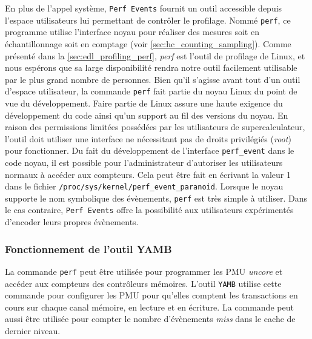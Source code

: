             En plus de l'appel système, \texttt{Perf Events} fournit un outil accessible depuis l'espace utilisateurs lui permettant de contrôler le profilage. Nommé \texttt{perf}, ce programme utilise l'interface noyau pour réaliser des mesures soit en échantillonnage soit en comptage (voir \autoref{sec:hc_counting_sampling}). Comme présenté dans la \autoref{sec:edl_profiling_perf}, \textit{perf} est l'outil de profilage de Linux, et nous espérons que sa large disponibilité rendra notre outil facilement utilisable par le plus grand nombre de personnes. Bien qu'il s'agisse avant tout d'un outil d'espace utilisateur, la commande \verb=perf= fait partie du noyau Linux du point de vue du développement. Faire partie de Linux assure une haute exigence du développement du code ainsi qu'un support au fil des versions du noyau. En raison des permissions limitées possédées par les utilisateurs de supercalculateur, l'outil doit utiliser une interface ne nécessitant pas de droits privilégiés (\textit{root}) pour fonctionner. Du fait du développement de l'interface \verb=perf_event= dans le code noyau, il est possible pour l'administrateur d'autoriser les utilisateurs normaux à accéder aux compteurs. Cela peut être fait en écrivant la valeur 1 dans le fichier \verb=/proc/sys/kernel/perf_event_paranoid=.
            Lorsque le noyau supporte le nom symbolique des évènements, \texttt{perf} est très simple à utiliser. Dans le cas contraire, \texttt{Perf Events} offre la possibilité aux utilisateurs expérimentés d'encoder leurs propres évènements.
                
            
    \subsubsection{Fonctionnement de l'outil YAMB}
     
         La commande \verb=perf= peut être utilisée pour programmer les \gls{PMU} \textit{uncore} et accéder aux compteurs des contrôleurs mémoires. L'outil \verb=YAMB= utilise cette commande pour configurer les PMU pour qu'elles comptent les transactions en cours sur chaque canal mémoire, en lecture et en écriture. La commande peut aussi être utilisée pour compter le nombre d'évènements \textit{\gls{miss}} dans le cache de dernier niveau.
        
